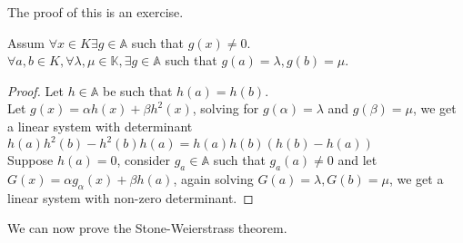 \documentclass[../main.tex]{subfiles}
\begin{document}
The proof of this is an exercise.
\begin{lemma}
Assum $\forall x \in K \exists g \in \mathbb{A}$ such that $g( x) \neq 0$.\\
$\forall a,b \in K, \forall \lambda,\mu\in \mathbb{K},\exists g \in \mathbb{A}$ such that $g(a) =\lambda, g( b) = \mu$.
\end{lemma}
\begin{proof}
Let $h \in \mathbb{A}$ be such that $h( a) = h( b) $.\\
Let $g( x) = \alpha h( x) + \beta h^{2}( x) $, solving for $g( \alpha) = \lambda$ and $g( \beta) = \mu$, we get a linear system with determinant $h( a) h^{2}( b) - h^{2}( b) h( a) = h( a) h( b) ( h( b) -h( a) ) $ \\
Suppose $h( a) = 0$, consider $g_a\in \mathbb{A} $ such that $g_a( a) \neq 0$ and let $G( x) = \alpha g_\alpha( x) + \beta h( a) $, again solving $G(a	) = \lambda, G( b) = \mu  $, we get a linear system with non-zero determinant.
\end{proof}
We can now prove the Stone-Weierstrass theorem.
\end{document}
